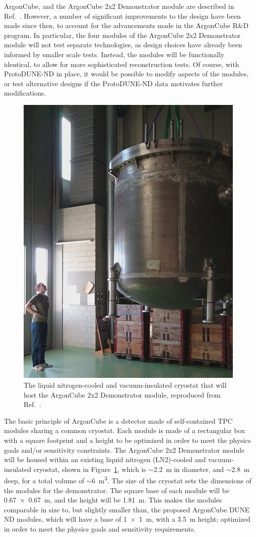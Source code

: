 ArgonCube, and the ArgonCube 2x2 Demonstrator module are described in Ref.~\cite{argoncube_loi}. However, a number of significant improvements to the design have been made since then, to account for the advancements made in the ArgonCube R\&D program. In particular, the four modules of the ArgonCube 2x2 Demonstrator module will not test separate technologies, as design choices have already been informed by smaller scale tests. Instead, the modules will be functionally identical, to allow for more sophisticated reconstruction tests. Of course, with ProtoDUNE-ND in place, it would be possible to modify aspects of the modules, or test alternative designs if the ProtoDUNE-ND data motivates further modifications.

\begin{figure}[htbp]
\centering
\includegraphics[width=0.45\linewidth]{plots/cryostat}
\caption{The liquid nitrogen-cooled and vacuum-insulated cryostat that will host the ArgonCube 2x2 Demonstrator module, reproduced from Ref.~\cite{argoncube_loi}.}
\label{fig:2x2_cryostat}
\end{figure}

The basic principle of ArgonCube is a detector made of self-contained TPC modules sharing a common cryostat. Each module is made of a rectangular box with a square footprint and a height to be optimized in order to meet the physics goals and/or sensitivity constraints. The ArgonCube 2x2 Demonstrator module will be housed within an existing liquid nitrogen (LN2)-cooled and vacuum-insulated cryostat, shown in Figure~\ref{fig:2x2_cryostat}, which is $\sim$\SI{2.2}{\metre} in diameter, and $\sim$\SI{2.8}{\metre} deep, for a total volume of $\sim$\SI{6}{\metre\cubed}. The size of the cryostat sets the dimensions of the modules for the demonstrator. The square base of each module will be \SI{0.67 x 0.67}{\metre}, and the height will be \SI{1.81}{\metre}. This makes the modules comparable in size to, but slightly smaller than, the proposed ArgonCube DUNE ND modules, which will have a base of \SI{1 x 1}{\metre}, with a \SI{3.5}{\metre} height; optimized in order to meet the physics goals and sensitivity requirements.

